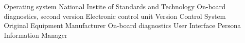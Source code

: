 		{Operating system}
		{National Instite of Standards and Technology}
		{On-board diagnostics, second version}
		{Electronic control unit}
		{Version Control System}
		{Original Equipment Manufacturer}
		{}
		{}
		{On-board diagnostics}
		{User Interface}
		{Persona Information Manager}